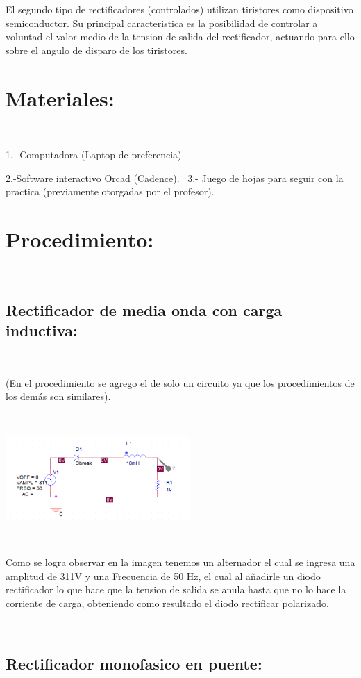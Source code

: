 \documentclass[12pt,letterpaper]{article}
\begin{document}
El segundo tipo de rectificadores (controlados) utilizan tiristores como dispositivo semiconductor. Su principal caracteristica es la posibilidad de controlar a voluntad el valor medio de la tension de salida del rectificador, actuando para ello sobre el angulo de disparo de los tiristores.
\

\section{Materiales:}
\

1.- Computadora (Laptop de preferencia).
\

2.-Software interactivo Orcad (Cadence).
\
3.- Juego de hojas para seguir con la practica (previamente otorgadas por el profesor).
\

\section{Procedimiento:}
\

\subsection{Rectificador de media onda con carga inductiva:}
\

(En el procedimiento se agrego el de solo un circuito ya que los procedimientos de los demás son similares).

\

\includegraphics[width=7cm]{Circuito 1-2.png} 

\

Como se logra observar en la imagen tenemos un alternador el cual se ingresa una amplitud de 311V y una Frecuencia de 50 Hz, el cual al añadirle un diodo rectificador lo que hace que la tension de salida se anula hasta que no lo hace la corriente de carga, obteniendo como resultado el diodo rectificar polarizado.
\

\

\subsection{Rectificador monofasico en puente:}
\
\end{document}

